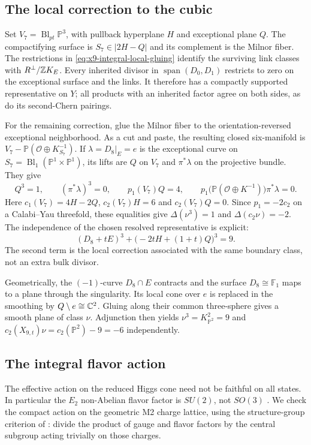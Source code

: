 \subsection{The local correction to the cubic}

Set $V_7=\operatorname{Bl}_{pt}\mathbb P^3$, with pullback
hyperplane $H$ and exceptional plane $Q$. The compactifying
surface is $S_7\in|2H-Q|$ and its complement is the Milnor
fiber. The restrictions in \eqref{eq:x9-integral-local-gluing}
identify the surviving link classes with $R^\perp/\mathbb Z K_E$.
Every inherited divisor in $\operatorname{span}(D_0,D_1)$
restricts to zero on the exceptional surface and the links.
It therefore has a compactly supported representative on $Y$;
all products with an inherited factor agree on both sides, as
do its second-Chern pairings.

For the remaining correction, glue the Milnor fiber to the
orientation-reversed exceptional neighborhood. As a cut and paste,
the resulting closed six-manifold is
$V_7-\mathbb P(\mathcal O\oplus K_{S_7}^{-1})$.
If $\lambda=D_8|_E=e$ is the exceptional curve on
$S_7=\operatorname{Bl}_1(\mathbb P^1\times\mathbb P^1)$,
its lifts are $Q$ on $V_7$ and $\pi^*\lambda$ on the projective
bundle. They give
\begin{equation}
 Q^3=1,\qquad (\pi^*\lambda)^3=0,\qquad
 p_1(V_7)Q=4,\qquad
 p_1\bigl(\mathbb P(\mathcal O\oplus K^{-1})\bigr)\pi^*\lambda=0.
\end{equation}
Here $c_1(V_7)=4H-2Q$, $c_2(V_7)H=6$ and $c_2(V_7)Q=0$.
Since $p_1=-2c_2$ on a Calabi--Yau threefold, these equalities
give $\Delta(\nu^3)=1$ and $\Delta(c_2\nu)=-2$.
The independence of the chosen resolved representative is explicit:
\begin{equation}
 (D_8+tE)^3+\bigl(-2tH+(1+t)Q\bigr)^3=9.
\end{equation}
The second term is the local correction associated with the same
boundary class, not an extra bulk divisor.

Geometrically, the $(-1)$-curve $D_8\cap E$ contracts and the
surface $D_8\cong\mathbb F_1$ maps to a plane through the
singularity. Its local cone over $e$ is replaced in the smoothing
by $Q\setminus e\cong\mathbb C^2$. Gluing along their common
three-sphere gives a smooth plane of class $\nu$.
Adjunction then yields $\nu^3=K_{\mathbb P^2}^2=9$ and
$c_2(X_{9,t})\nu=c_2(\mathbb P^2)-9=-6$ independently.

\subsection{The integral flavor action}
The effective action on the reduced Higgs cone need not be faithful
on all states. In particular the $E_2$ non-Abelian flavor factor is
$SU(2)$, not $SO(3)$ \cite[Section~3.9.1]{Apruzzi:2021vcu}.
We check the compact action on the geometric M2 charge lattice,
using the structure-group criterion of
\cite[Section~2.1]{Apruzzi:2021vcu}: divide the product of gauge and
flavor factors by the central subgroup acting trivially on those charges.

